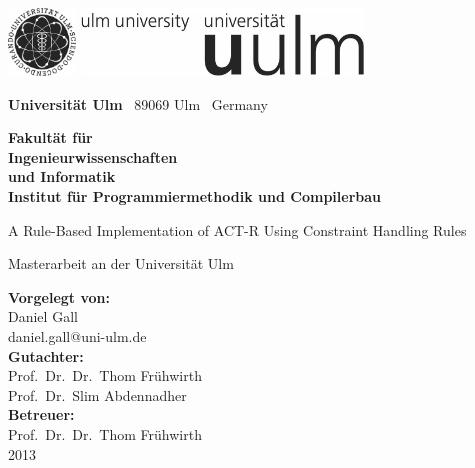 \documentclass[
    a4paper,
    10pt,
    bibliography=totoc,
    twoside,
    openright,
    numbers=noenddot,
    headings=normal,
    DIV=9,
    BCOR=7mm
    ,parskip
]{scrbook}
\makeatletter
\newcommand{\fullname}{Daniel Gall}
\newcommand{\email}{daniel.gall@uni-ulm.de}
\newcommand{\titel}{A Rule-Based Implementation of ACT-R Using Constraint Handling Rules}
\newcommand{\jahr}{2013}
\newcommand{\gutachterA}{Prof.\ Dr.\ Dr.\ Thom Frühwirth}
\newcommand{\gutachterB}{Prof.\ Dr.\ Slim Abdennadher}
\newcommand{\betreuer}{Prof.\ Dr.\ Dr.\ Thom Frühwirth}
\newcommand{\fakultaet}{Ingenieurwissenschaften\\und Informatik}
\newcommand{\institut}{Institut für Programmiermethodik und Compilerbau}
\newcommand{\arbeit}{Masterarbeit}
\makeatother
\begin{document}
\frontmatter


\thispagestyle{empty}
\begin{addmargin*}[4mm]{-32mm}
    \includegraphics[height=1.8cm]{images/unilogo_bild}
    \hfill
    \includegraphics[height=1.8cm]{images/unilogo_wort}
    \vspace*{2.1em}

    \footnotesize
    \textbf{Universität Ulm} \textbar ~89069 Ulm \textbar ~Germany
    \hfill
    \parbox[t]{42mm}{\bfseries Fakultät für\\\fakultaet\\\mdseries\institut}
    \vspace*{2cm}

    \parbox{140mm}{\bfseries \raggedright \huge \titel}

    {\arbeit{} an der Universität Ulm}
    \vspace*{4em}

    \textbf{Vorgelegt von:}\\\fullname\\\email\\[2em]
    \textbf{Gutachter:}\\\gutachterA\\\gutachterB\\[2em]
    \textbf{Betreuer:}\\\betreuer\\[1.5em]
    \jahr
\end{addmargin*}
\end{document}
